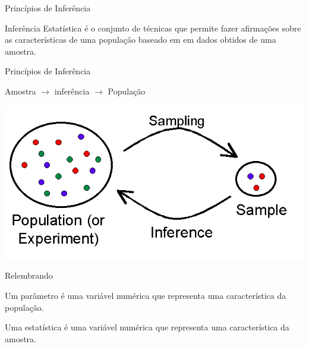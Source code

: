 \documentclass{beamer}
\begin{document}
\begin{frame}{Princípios de Inferência}
  \begin{definition}
\alert{Inferência Estatística} é o conjunto de técnicas que permite
fazer afirmações sobre as características de uma população baseado em
em dados obtidos de uma amostra.
  \end{definition}
\end{frame}

\begin{frame}{Princípios de Inferência}
  \begin{block}{}
    \begin{center}
      Amostra $\rightarrow$ \alert{inferência} $\rightarrow$ População
    \end{center}
  \end{block}
  \begin{center}
    \includegraphics[height=0.4\textheight]{Inf_I/PopulationSample}
  \end{center}
\end{frame}

\begin{frame}{Relembrando}
  \begin{definition}
    Um \alert<1>{parâmetro} é uma variável numérica que representa uma
    característica da \alert<1>{população}.
  \end{definition}
  \begin{definition}
    Uma \alert<2>{estatística} é uma variável numérica que representa
    uma característica da \alert<2>{amostra}.
  \end{definition}
\end{frame}
\end{document}
